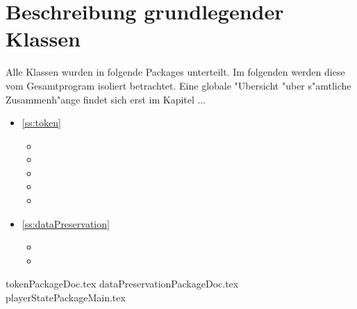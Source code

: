 \section{Beschreibung grundlegender Klassen}
Alle Klassen wurden in folgende Packages unterteilt. Im folgenden werden diese vom Gesamtprogram isoliert betrachtet. Eine globale "Ubersicht "uber s"amtliche Zusammenh"ange findet sich erst im Kapitel ...
\begin{itemize}
	\item \ref{ss:token} 
	\begin{itemize}
		\item {}
		\item {}
		\item {}
		\item {}
		\item {}
	\end{itemize}
	\item \ref{ss:dataPreservation} 
	\begin{itemize}
		\item {}
		\item {}
	\end{itemize}
\end{itemize}
{tokenPackageDoc.tex}
\newpage
{dataPreservationPackageDoc.tex}
\newpage
{playerStatePackageMain.tex}
